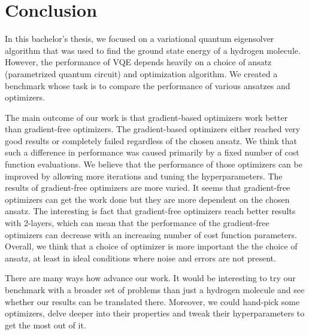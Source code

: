 \chapter*{Conclusion}


In this bachelor's thesis, we focused on a variational quantum eigensolver algorithm that was used to find the ground state energy of a hydrogen molecule. However, the performance of VQE depends heavily on a choice of ansatz (parametrized quantum circuit) and optimization algorithm. We created a benchmark whose task is to compare the performance of various ansatzes and optimizers.

The main outcome of our work is that gradient-based optimizers work better than gradient-free optimizers. The gradient-based optimizers either reached very good results or completely failed regardless of the chosen ansatz. We think that such a difference in performance was caused primarily by a fixed number of cost function evaluations. We believe that the performance of those optimizers can be improved by allowing more iterations and tuning the hyperparameters. The results of gradient-free optimizers are more varied. It seems that gradient-free optimizers can get the work done but they are more dependent on the chosen ansatz. The interesting is fact that gradient-free optimizers reach better results with 2-layers, which can mean that the performance of the gradient-free optimizers can decrease with an increasing number of cost function parameters. Overall, we think that a choice of optimizer is more important the the choice of ansatz, at least in ideal conditions where noise and errors are not present.

There are many ways how advance our work. It would be interesting to try our benchmark with a broader set of problems than just a hydrogen molecule and see whether our results can be translated there. Moreover, we could hand-pick some optimizers, delve deeper into their properties and tweak their hyperparameters to get the most out of it. 